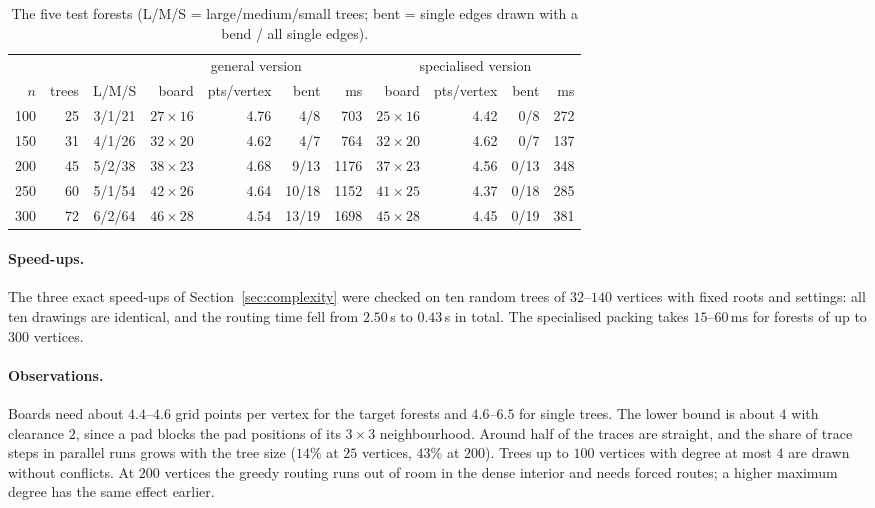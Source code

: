\documentclass[11pt,a4paper]{article}
\theoremstyle{remark}
\begin{document}
\begin{table}[t]
\centering
\caption{The five test forests (L/M/S = large/medium/small trees; bent = single edges drawn with a bend / all single
edges).}
\label{tab:forests}
\small\setlength{\tabcolsep}{3.6pt}
\begin{tabular}{rrc|rrrr|rrrr}
\toprule
 & & & \multicolumn{4}{c|}{general version} & \multicolumn{4}{c}{specialised version}\\
$n$ & trees & L/M/S & board & pts/vertex & bent & ms & board & pts/vertex & bent & ms\\
\midrule
100 & 25 & 3/1/21 & $27\times16$ & 4.76 & 4/8 & 703 & $25\times16$ & 4.42 & 0/8 & 272 \\
150 & 31 & 4/1/26 & $32\times20$ & 4.62 & 4/7 & 764 & $32\times20$ & 4.62 & 0/7 & 137 \\
200 & 45 & 5/2/38 & $38\times23$ & 4.68 & 9/13 & 1176 & $37\times23$ & 4.56 & 0/13 & 348 \\
250 & 60 & 5/1/54 & $42\times26$ & 4.64 & 10/18 & 1152 & $41\times25$ & 4.37 & 0/18 & 285 \\
300 & 72 & 6/2/64 & $46\times28$ & 4.54 & 13/19 & 1698 & $45\times28$ & 4.45 & 0/19 & 381 \\
\bottomrule
\end{tabular}
\end{table}

\paragraph{Speed-ups.} The three exact speed-ups of Section~\ref{sec:complexity} were checked on ten random trees of
$32$--$140$ vertices with fixed roots and settings: all ten drawings are identical, and the routing time fell from
$2.50$\,s to $0.43$\,s in total. The specialised packing takes $15$--$60$\,ms for forests of up to $300$ vertices.

\paragraph{Observations.} Boards need about $4.4$--$4.6$ grid points per vertex for the target forests and
$4.6$--$6.5$ for single trees. The lower bound is about $4$ with clearance $2$, since a pad blocks the pad positions of
its $3\times3$ neighbourhood. Around half of the traces are straight, and the share of trace steps in parallel runs
grows with the tree size ($14\%$ at $25$ vertices, $43\%$ at $200$). Trees up to $100$ vertices with degree at most
$4$ are drawn without conflicts. At $200$ vertices the greedy routing runs out of room in the dense interior and needs
forced routes; a higher maximum degree has the same effect earlier.
\end{document}
